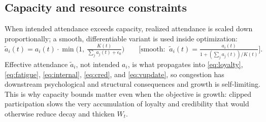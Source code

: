 \documentclass[11pt]{article}
\begin{document}
\subsection{Capacity and resource constraints}\label{sec:capacity}
When intended attendance exceeds capacity, realized attendance is scaled down proportionally; a smooth, differentiable variant is used inside optimization:
\begin{equation}\tag{12}\label{eq:capacity}
\tilde a_i(t)=a_i(t)\cdot\min\!\Big(1,\ \tfrac{K(t)}{\sum_j a_j(t)+\epsilon_0}\Big)
\qquad\Big[\text{smooth: }\ \tilde a_i(t)=\tfrac{a_i(t)}{1+(\sum_j a_j(t))/K(t)}\Big].
\end{equation}
Effective attendance $\tilde a_i$, not intended $a_i$, is what propagates into \eqref{eq:loyalty}, \eqref{eq:fatigue}, \eqref{eq:internal}, \eqref{eq:cred}, and \eqref{eq:vupdate}, so congestion has downstream psychological and structural consequences and growth is self-limiting. This is why capacity bounds matter even when the objective is growth: clipped participation slows the very accumulation of loyalty and credibility that would otherwise reduce decay and thicken $W_t$.
\end{document}
